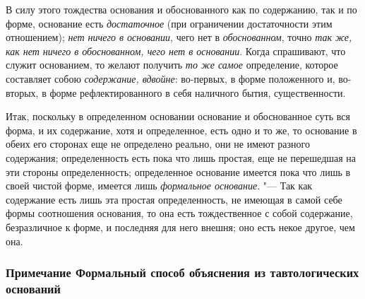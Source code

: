 В силу этого тождества основания и обоснованного как по содержанию, так и по
форме, основание есть {\em достаточное} (при
ограничении достаточности этим отношением); {\em нет
ничего в основании}, чего нет в {\em обоснованном},
точно {\em так же, как нет ничего в обоснованном, чего
нет в основании}. Когда спрашивают, что служит основанием, то желают
получить {\em то же самое} определение, которое
составляет собою {\em содержание, вдвойне}: во-первых,
в форме положенного и, во-вторых, в форме рефлектированного в себя
наличного бытия, существенности.

Итак, поскольку в определенном основании основание и обоснованное суть вся
форма, и их содержание, хотя и определенное, есть одно и то же, то
основание в обеих его сторонах еще не определено реально, они не имеют
разного содержания; определенность есть пока что лишь простая, еще не
перешедшая на эти стороны определенность; определенное основание имеется
пока что лишь в своей чистой форме, имеется лишь
{\em формальное основание}. "--- Так как содержание есть
лишь эта простая определенность, не имеющая в самой себе формы соотношения
основания, то она есть тождественное с собой содержание, безразличное к
форме, и последняя для него внешня; оно есть некое другое, чем она.


\subsubsection[Примечание Формальный способ объяснения из тавтологических оснований]
{Примечание Формальный способ объяснения из тавтологических оснований}

